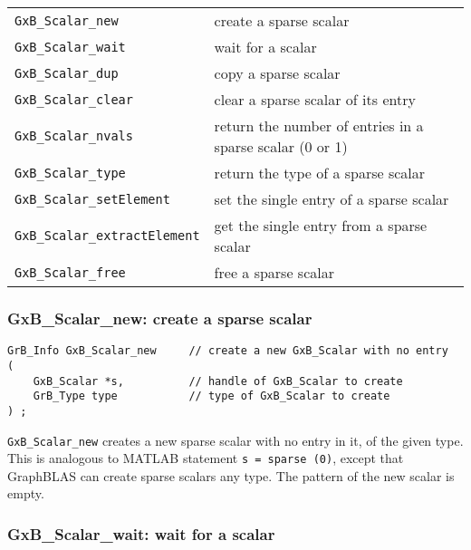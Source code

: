 \documentclass[12pt]{article}
\begin{document}
\vspace{0.2in}
{\footnotesize
\begin{tabular}{ll}
\hline
\verb'GxB_Scalar_new'            & create a sparse scalar \\
\verb'GxB_Scalar_wait'           & wait for a scalar \\
\verb'GxB_Scalar_dup'            & copy a sparse scalar \\
\verb'GxB_Scalar_clear'          & clear a sparse scalar of its entry \\
\verb'GxB_Scalar_nvals'          & return the number of entries in a
                                   sparse scalar (0 or 1) \\
\verb'GxB_Scalar_type'           & return the type of a sparse scalar \\
\verb'GxB_Scalar_setElement'     & set the single entry of a sparse scalar \\
\verb'GxB_Scalar_extractElement' & get the single entry from a sparse scalar \\
\verb'GxB_Scalar_free'           & free a sparse scalar \\
\hline
\end{tabular}
}

\subsubsection{{\sf GxB\_Scalar\_new:} create a sparse scalar}
\label{scalar_new}

\begin{mdframed}[userdefinedwidth=6in]
{\footnotesize
\begin{verbatim}
GrB_Info GxB_Scalar_new     // create a new GxB_Scalar with no entry
(
    GxB_Scalar *s,          // handle of GxB_Scalar to create
    GrB_Type type           // type of GxB_Scalar to create
) ;
\end{verbatim}
} \end{mdframed}

\verb'GxB_Scalar_new' creates a new sparse scalar with no
entry in it, of the given type.  This is analogous to MATLAB statement
\verb's = sparse (0)', except that GraphBLAS can create sparse scalars any
type.  The pattern of the new scalar is empty.

\subsubsection{{\sf GxB\_Scalar\_wait:} wait for a scalar}
\end{document}
